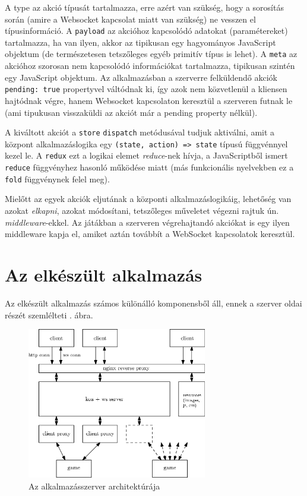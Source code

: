 \documentclass[12pt]{article}
\begin{document}
A type az akció típusát tartalmazza, erre azért van szükség, hogy a sorosítás
során (amire a Websocket kapcsolat miatt van szükség) ne vesszen el
típusinformáció.
A \texttt{payload} az akcióhoz kapcsolódó adatokat (paramétereket) tartalmazza,
ha van ilyen, akkor az tipikusan egy hagyományos JavaScript objektum (de
természetesen tetszőleges egyéb primitív típus is lehet).
A \texttt{meta} az akcióhoz szorosan nem kapcsolódó információkat tartalmazza, tipikusan
szintén egy JavaScript objektum.
Az alkalmazásban a szerverre felküldendő akciók \texttt{pending: true} propertyvel
váltódnak ki, így azok nem közvetlenül a kliensen hajtódnak végre, hanem
Websocket kapcsolaton keresztül a szerveren futnak le (ami tipukusan visszaküldi az
akciót már a pending property nélkül).

A kiváltott akciót a \texttt{store} \texttt{dispatch} metódusával tudjuk aktiválni,
amit a központ alkalmazáslogika egy \texttt{(state, action) => state} típusú
függvénnyel kezel le. A \texttt{redux} ezt a logikai elemet \emph{reduce}-nek hívja,
a JavaScriptből ismert \texttt{reduce} függvényhez hasonló működése miatt (más funkcionális nyelvekben
ez a \texttt{fold} függvénynek felel meg).

Mielőtt az egyek akciók eljutának a központi alkalmazáslogikáig, lehetőség van
azokat \emph{elkapni}, azokat módosítani, tetszőleges műveletet végezni rajtuk ún. \emph{middleware}-ekkel.
Az játákban a szerveren végrehajtandó akciókat is egy ilyen middleware kapja el,
amiket aztán továbbít a WebSocket kapcsolatok keresztül.

\section{Az elkészült alkalmazás}

Az elkészült alkalmazás számos különálló komponensből áll, ennek a szerver oldai
részét szemlélteti . ábra.

\begin{figure}[h!]
  \centering
  \includegraphics[width=0.7\textwidth]{figures/app}
  \caption{Az alkalmazásszerver architektúrája}
  \label{fig:app-arch}
\end{figure}
\end{document}
